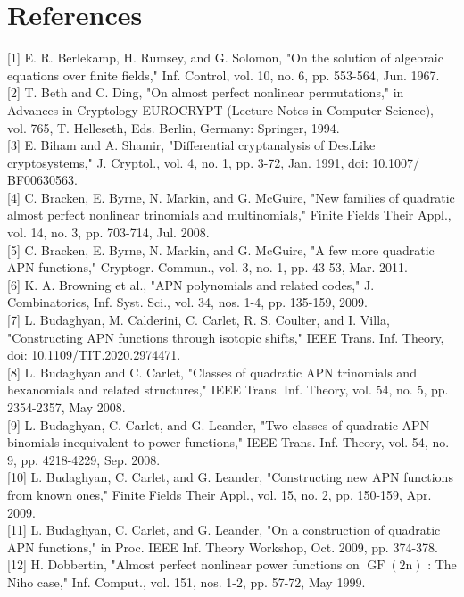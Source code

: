 \documentclass[10pt]{article}
\begin{document}
\section*{References}
[1] E. R. Berlekamp, H. Rumsey, and G. Solomon, "On the solution of algebraic equations over finite fields," Inf. Control, vol. 10, no. 6, pp. 553-564, Jun. 1967.\\[0pt]
[2] T. Beth and C. Ding, "On almost perfect nonlinear permutations," in Advances in Cryptology-EUROCRYPT (Lecture Notes in Computer Science), vol. 765, T. Helleseth, Eds. Berlin, Germany: Springer, 1994.\\[0pt]
[3] E. Biham and A. Shamir, "Differential cryptanalysis of Des.Like cryptosystems," J. Cryptol., vol. 4, no. 1, pp. 3-72, Jan. 1991, doi: 10.1007/ BF00630563.\\[0pt]
[4] C. Bracken, E. Byrne, N. Markin, and G. McGuire, "New families of quadratic almost perfect nonlinear trinomials and multinomials," Finite Fields Their Appl., vol. 14, no. 3, pp. 703-714, Jul. 2008.\\[0pt]
[5] C. Bracken, E. Byrne, N. Markin, and G. McGuire, "A few more quadratic APN functions," Cryptogr. Commun., vol. 3, no. 1, pp. 43-53, Mar. 2011.\\[0pt]
[6] K. A. Browning et al., "APN polynomials and related codes," J. Combinatorics, Inf. Syst. Sci., vol. 34, nos. 1-4, pp. 135-159, 2009.\\[0pt]
[7] L. Budaghyan, M. Calderini, C. Carlet, R. S. Coulter, and I. Villa, "Constructing APN functions through isotopic shifts," IEEE Trans. Inf. Theory, doi: 10.1109/TIT.2020.2974471.\\[0pt]
[8] L. Budaghyan and C. Carlet, "Classes of quadratic APN trinomials and hexanomials and related structures," IEEE Trans. Inf. Theory, vol. 54, no. 5, pp. 2354-2357, May 2008.\\[0pt]
[9] L. Budaghyan, C. Carlet, and G. Leander, "Two classes of quadratic APN binomials inequivalent to power functions," IEEE Trans. Inf. Theory, vol. 54, no. 9, pp. 4218-4229, Sep. 2008.\\[0pt]
[10] L. Budaghyan, C. Carlet, and G. Leander, "Constructing new APN functions from known ones," Finite Fields Their Appl., vol. 15, no. 2, pp. 150-159, Apr. 2009.\\[0pt]
[11] L. Budaghyan, C. Carlet, and G. Leander, "On a construction of quadratic APN functions," in Proc. IEEE Inf. Theory Workshop, Oct. 2009, pp. 374-378.\\[0pt]
[12] H. Dobbertin, "Almost perfect nonlinear power functions on $\operatorname{GF}(2 \mathrm{n})$ : The Niho case," Inf. Comput., vol. 151, nos. 1-2, pp. 57-72, May 1999.\\[0pt]
\end{document}
